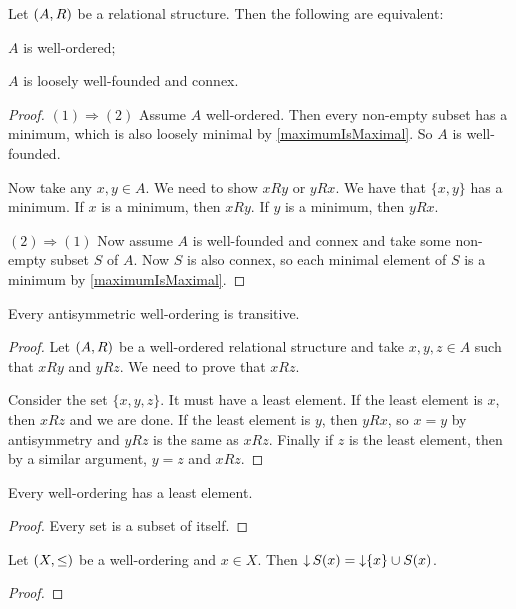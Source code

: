 \begin{proposition} \label{wellOrderedCondition}
Let $\left( A,R \right)$ be a relational structure. Then the following are equivalent:
\item $A$ is well-ordered;
\item $A$ is loosely well-founded and connex.
\end{proposition}
\begin{proof}
$(1) \Rightarrow (2)$ Assume $A$ well-ordered. Then every non-empty subset has a minimum, which is also loosely minimal by \ref{maximumIsMaximal}. So $A$ is well-founded.

Now take any $x,y\in A$. We need to show $xRy$ or $yRx$. We have that $\{x,y\}$ has a minimum. If $x$ is a minimum, then $xRy$. If $y$ is a minimum, then $yRx$.

$(2) \Rightarrow (1)$ Now assume $A$ is well-founded and connex and take some non-empty subset $S$ of $A$. Now $S$ is also connex, so each minimal element of $S$ is a minimum by \ref{maximumIsMaximal}.
\end{proof}

\begin{proposition}
Every antisymmetric well-ordering is transitive.
\end{proposition}
\begin{proof}
Let $\left( A,R \right)$ be a well-ordered relational structure and take $x,y,z\in A$ such that $xRy$ and $yRz$. We need to prove that $xRz$.

Consider the set $\{x,y,z\}$. It must have a least element. If the least element is $x$, then $xRz$ and we are done. If the least element is $y$, then $yRx$, so $x=y$ by antisymmetry and $yRz$ is the same as $xRz$. Finally if $z$ is the least element, then by a similar argument, $y=z$ and $xRz$.
\end{proof}

\begin{lemma}
Every well-ordering has a least element.
\end{lemma}
\begin{proof}
Every set is a subset of itself.
\end{proof}

\begin{lemma}
Let $\left( X,\leq \right)$ be a well-ordering and $x\in X$. Then $\operatorname{\downarrow} S(x) = \operatorname{\downarrow}\{x\}\cup S(x)$.
\end{lemma}
\begin{proof}

\end{proof}

